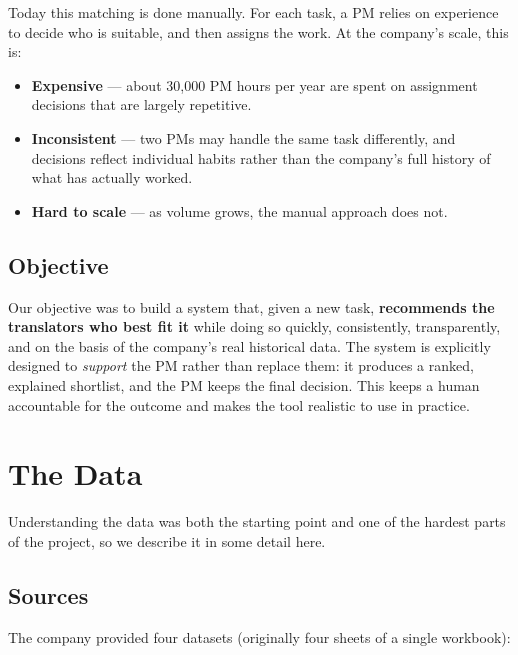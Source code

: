 \documentclass[9pt,a4paper,twoside]{utils/tau-class/tau}
\begin{document}
Today this matching is done manually. For each task, a PM relies on experience to decide who is suitable, and then assigns the work. At the company's scale, this is:

\begin{itemize}
    \item \textbf{Expensive} --- about 30,000 PM hours per year are spent on assignment decisions that are largely repetitive.
    \item \textbf{Inconsistent} --- two PMs may handle the same task differently, and decisions reflect individual habits rather than the company's full history of what has actually worked.
    \item \textbf{Hard to scale} --- as volume grows, the manual approach does not.
\end{itemize}

\subsection{Objective}

Our objective was to build a system that, given a new task, \textbf{recommends the translators who best fit it} while doing so quickly, consistently, transparently, and on the basis of the company's real historical data. The system is explicitly designed to \emph{support} the PM rather than replace them: it produces a ranked, explained shortlist, and the PM keeps the final decision. This keeps a human accountable for the outcome and makes the tool realistic to use in practice.

\section{The Data}

Understanding the data was both the starting point and one of the hardest parts of the project, so we describe it in some detail here.

\subsection{Sources}

The company provided four datasets (originally four sheets of a single workbook):
\end{document}
